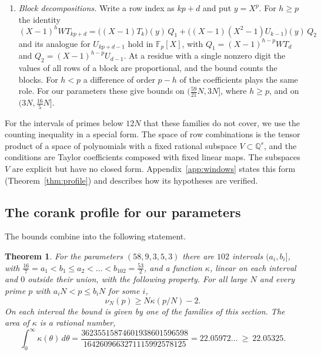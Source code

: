 \documentclass[11pt]{amsart}
\newcommand{\Chi}{22.05972}
\newcommand{\ChiLean}{22.05325}
\newtheorem{theorem}{Theorem}[section]
\theoremstyle{definition}
\theoremstyle{remark}
\numberwithin{equation}{section}
\newcommand{\Q}{\mathbb Q}
\newcommand{\F}{\mathbb F}
\begin{document}
\begin{enumerate}[label=(F\arabic*),wide]
exists for every $p$ prime to a fixed integer, and the bound is the dimension of the solution space minus
the number of conditions. In two of these families the entries depend only on the residue of the column
modulo $p$, so the difference of order $q$ imposes $(p-q)_+$ conditions. When $h\ge p$ one writes
$(X-1)^h=(X^p-1)(X-1)^{h-p}$, which imposes $h-p$ more conditions. These families give the bounds on
$(\frac{58}{17}N,\frac{59}{17}N]$, $(\frac{29}8N,\frac{11}3N]$, $(\frac{16}7N,\frac52N]$ and on six intervals in
$(\frac{341}{25}N,\frac{809}{50}N]$.
\item \emph{Block decompositions.} Write a row index as $kp+d$ and put $y=X^p$. For $h\ge p$ the identity
\[
 (X-1)^hWT_{kp+d}=\bigl((X-1)T_k\bigr)(y)\,Q_1+\bigl((X-1)(X^2-1)U_{k-1}\bigr)(y)\,Q_2
\]
and its analogue for $U_{kp+d-1}$ hold in $\F_p[X]$, with $Q_1=(X-1)^{h-p}WT_d$ and $Q_2=(X-1)^{h-p}U_{d-1}$.
At a residue with a single nonzero digit the values of all rows of a block are proportional, and the bound
counts the blocks. For $h<p$ a difference of order $p-h$ of the coefficients plays the same role. For our
parameters these give bounds on $(\frac{59}{21}N,3N]$, where $h\ge p$, and on $(3N,\frac{16}5N]$.
\end{enumerate}

For the intervals of primes below $12N$ that these families do not cover, we use the counting inequality
in a special form. The space of row combinations is the tensor product of a space of polynomials with a
fixed rational subspace $V\subset\Q^s$, and the conditions are Taylor coefficients composed with fixed linear
maps. The subspaces $V$ are explicit but have no closed form. Appendix~\ref{app:windows} states this form
(Theorem~\ref{thm:profile}) and describes how its hypotheses are verified.

\subsection{The corank profile for our parameters}\label{ssec:kappa}
The bounds combine into the following statement.

\begin{theorem}\label{thm:profile-D}
For the parameters $(58,9,3,5,3)$ there are $102$ intervals $(a_i,b_i]$, with
$\frac{16}7=a_1<b_1\le a_2<\dots<b_{102}=\frac{53}2$, and a function $\kappa$, linear on each interval and $0$
outside their union, with the following property. For all large $N$ and every prime $p$ with
$a_iN<p\le b_iN$ for some $i$,
\[
 \nu_N(p)\ge N\kappa(p/N)-2 .
\]
On each interval the bound is given by one of the families of this section. The area of $\kappa$ is a
rational number,
\[
 \int_0^\infty\kappa(\theta)\,d\theta=\frac{36235515874601938601596598}{1642609663271115992578125}=\Chi\ldots\ \ge\ \ChiLean .
\]
\end{theorem}
\end{document}
